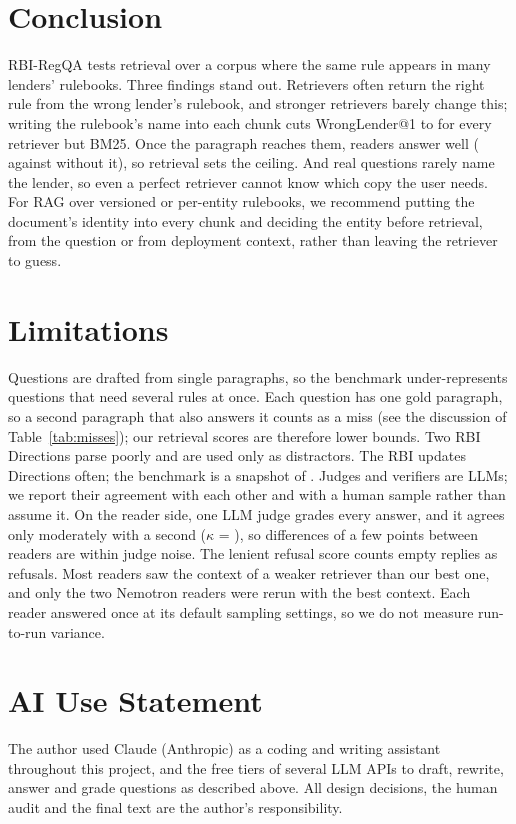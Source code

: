 \documentclass[11pt]{article}
\begin{document}
\section{Conclusion}
RBI-RegQA tests retrieval over a corpus where the same rule appears in many lenders' rulebooks. Three findings stand out. Retrievers often return the right rule from the wrong lender's rulebook, and stronger retrievers barely change this; writing the rulebook's name into each chunk cuts WrongLender@1 to \TitleWLRange{} for every retriever but BM25. Once the paragraph reaches them, readers answer well (\RdGoldIn{} against \RdGoldOut{} without it), so retrieval sets the ceiling. And real questions rarely name the lender, so even a perfect retriever cannot know which copy the user needs. For RAG over versioned or per-entity rulebooks, we recommend putting the document's identity into every chunk and deciding the entity before retrieval, from the question or from deployment context, rather than leaving the retriever to guess.

\section*{Limitations}
Questions are drafted from single paragraphs, so the benchmark under-represents questions that need several rules at once. Each question has one gold paragraph, so a second paragraph that also answers it counts as a miss (see the discussion of Table~\ref{tab:misses}); our retrieval scores are therefore lower bounds. Two RBI Directions parse poorly and are used only as distractors. The RBI updates Directions often; the benchmark is a snapshot of \SnapshotDate{}. Judges and verifiers are LLMs; we report their agreement with each other and with a human sample rather than assume it. On the reader side, one LLM judge grades every answer, and it agrees only moderately with a second ($\kappa$ = \JudgeKappa{}), so differences of a few points between readers are within judge noise. The lenient refusal score counts empty replies as refusals. Most readers saw the context of a weaker retriever than our best one, and only the two Nemotron readers were rerun with the best context. Each reader answered once at its default sampling settings, so we do not measure run-to-run variance.

\section*{AI Use Statement}
The author used Claude (Anthropic) as a coding and writing assistant throughout this project, and the free tiers of several LLM APIs to draft, rewrite, answer and grade questions as described above. All design decisions, the human audit and the final text are the author's responsibility.
\end{document}
